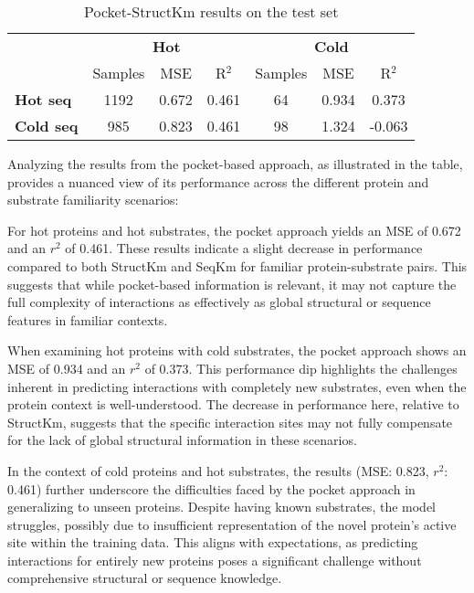 \begin{table}[ht]
  \centering
  \begin{tabular}{lcccccc}
  \hline
   & \multicolumn{3}{c}{\textbf{Hot}} & \multicolumn{3}{c}{\textbf{Cold}} \\
   & Samples & MSE & R\(^2\) & Samples & MSE & R\(^2\) \\ \hline
  \textbf{Hot seq}  & 1192 & 0.672 & 0.461 & 64 & 0.934 & 0.373 \\
  \textbf{Cold seq} & 985 & 0.823 & 0.461 & 98 & 1.324 & -0.063 \\ \hline
  \end{tabular}
  \caption{Pocket-StructKm results on the test set}
  \label{tab:results_pocket_test}
 \end{table}

Analyzing the results from the pocket-based approach, as illustrated in the table, provides a nuanced view of its performance across the different protein and substrate familiarity scenarios:

For hot proteins and hot substrates, the pocket approach yields an MSE of 0.672 and an $r^2$ of 0.461. These results indicate a slight decrease in performance compared to both StructKm and SeqKm for familiar protein-substrate pairs. This suggests that while pocket-based information is relevant, it may not capture the full complexity of interactions as effectively as global structural or sequence features in familiar contexts.
 
When examining hot proteins with cold substrates, the pocket approach shows an MSE of 0.934 and an $r^2$ of 0.373. This performance dip highlights the challenges inherent in predicting interactions with completely new substrates, even when the protein context is well-understood. The decrease in performance here, relative to StructKm, suggests that the specific interaction sites may not fully compensate for the lack of global structural information in these scenarios.
 
In the context of cold proteins and hot substrates, the results (MSE: 0.823, $r^2$: 0.461) further underscore the difficulties faced by the pocket approach in generalizing to unseen proteins. Despite having known substrates, the model struggles, possibly due to insufficient representation of the novel protein's active site within the training data. This aligns with expectations, as predicting interactions for entirely new proteins poses a significant challenge without comprehensive structural or sequence knowledge.
 
